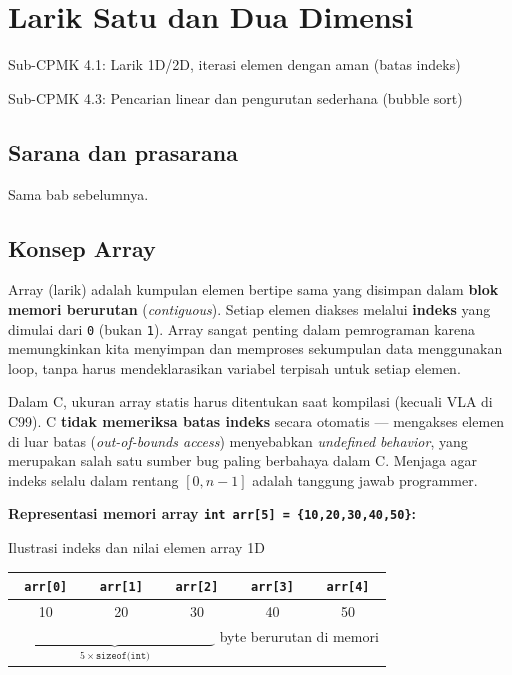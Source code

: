 \documentclass[../main.tex]{subfiles}
\begin{document}
\chapter{Larik Satu dan Dua Dimensi}

\begin{subcpmk}
  \item Sub-CPMK 4.1: Larik 1D/2D, iterasi elemen dengan aman (batas indeks)
  \item Sub-CPMK 4.3: Pencarian linear dan pengurutan sederhana (bubble sort)
\end{subcpmk}


\section{Sarana dan prasarana}
Sama bab sebelumnya.

\section{Konsep Array}

Array (larik) adalah kumpulan elemen bertipe sama yang disimpan dalam \textbf{blok memori berurutan} (\textit{contiguous}). Setiap elemen diakses melalui \textbf{indeks} yang dimulai dari \texttt{0} (bukan \texttt{1}). Array sangat penting dalam pemrograman karena memungkinkan kita menyimpan dan memproses sekumpulan data menggunakan loop, tanpa harus mendeklarasikan variabel terpisah untuk setiap elemen.

Dalam C, ukuran array statis harus ditentukan saat kompilasi (kecuali VLA di C99). C \textbf{tidak memeriksa batas indeks} secara otomatis --- mengakses elemen di luar batas (\textit{out-of-bounds access}) menyebabkan \textit{undefined behavior}, yang merupakan salah satu sumber bug paling berbahaya dalam C. Menjaga agar indeks selalu dalam rentang $[0, n-1]$ adalah tanggung jawab programmer.

\begin{konsep}
\textbf{Representasi memori array \texttt{int arr[5] = \{10,20,30,40,50\}}:}

\begin{modultable}[]{Ilustrasi indeks dan nilai elemen array 1D}
\begin{tabular}{|c|c|c|c|c|}
\hline
\texttt{arr[0]} & \texttt{arr[1]} & \texttt{arr[2]} & \texttt{arr[3]} & \texttt{arr[4]} \\
\hline
10 & 20 & 30 & 40 & 50 \\
\hline
\multicolumn{5}{|c|}{$\underbrace{\hspace{6cm}}_{5 \times \texttt{sizeof(int)}}$ byte berurutan di memori} \\
\hline
\end{tabular}
\end{modultable}
\end{konsep}
\end{document}
